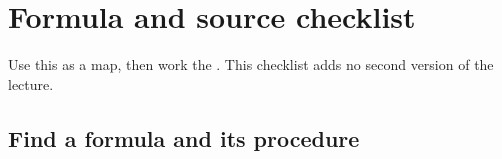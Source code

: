 \documentclass[letterpaper,11pt,english,openany,oneside]{jupyterBook}
\begin{document}
\par

\sphinxstepscope


\section{Formula and source checklist}
\label{\detokenize{lectures/lecture06/review:formula-and-source-checklist}}\label{\detokenize{lectures/lecture06/review:lec06-review}}\label{\detokenize{lectures/lecture06/review::doc}}
\sphinxAtStartPar
Use this as a map, then work the {\hyperref[\detokenize{lectures/lecture06/quiz-workbook::doc}]{}}. This checklist adds no second version of the lecture.


\subsection{Find a formula and its procedure}
\label{\detokenize{lectures/lecture06/review:find-a-formula-and-its-procedure}}
\end{document}
